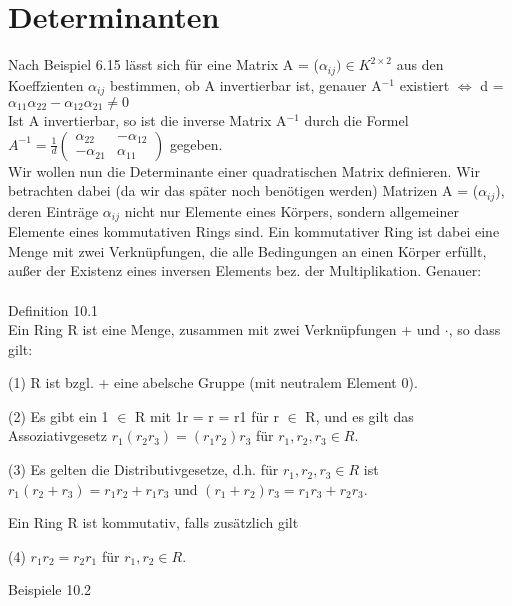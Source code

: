 \section{Determinanten}
Nach Beispiel 6.15 lässt sich für eine Matrix A = ($\alpha_{ij}) \in K^{2 \times 2}$ aus den Koeffzienten $\alpha_{ij}$ bestimmen, ob A invertierbar ist, genauer A$^{-1}$ existiert $\Leftrightarrow$ d = $\alpha_{11}\alpha_{22} - \alpha_{12}\alpha_{21} \neq 0$\\
Ist A invertierbar, so ist die inverse Matrix A$^{-1}$ durch die Formel $A^{-1} = \frac{1}{d} \begin{pmatrix} \alpha_{22} & -\alpha_{12} \\ -\alpha_{21} & \alpha_{11} \end{pmatrix}$ gegeben.\\
Wir wollen nun die Determinante einer quadratischen Matrix definieren. Wir betrachten dabei (da wir das später noch benötigen werden) Matrizen A = ($\alpha_{ij}$), deren Einträge $\alpha_{ij}$ nicht nur Elemente eines Körpers, sondern allgemeiner Elemente eines kommutativen Rings sind. Ein kommutativer Ring ist dabei eine Menge mit zwei Verknüpfungen, die alle Bedingungen an einen Körper erfüllt, außer der Existenz eines inversen Elements bez. der Multiplikation. Genauer:\\
\\
Definition 10.1\\
Ein Ring R ist eine Menge, zusammen mit zwei Verknüpfungen + und $\cdot$, so dass gilt:
\begin{compactenum}
\item[(1)] R ist bzgl. + eine abelsche Gruppe (mit neutralem Element 0).
\item[(2)] Es gibt ein 1 $\in$ R mit 1r = r = r1 für r $\in$ R, und es gilt das Assoziativgesetz $r_1(r_2r_3) = (r_1r_2)r_3$ für $r_1, r_2, r_3 \in R$.
\item[(3)] Es gelten die Distributivgesetze, d.h. für $r_1, r_2, r_3 \in R$ ist $r_1(r_2 + r_3) = r_1r_2 + r_1r_3$ und $(r_1 + r_2)r_3 = r_1r_3 + r_2r_3$.
\end{compactenum}
Ein Ring R ist kommutativ, falls zusätzlich gilt
\begin{compactenum}
\item[(4)] $r_1r_2 = r_2r_1$ für $r_1,r_2 \in R$.\\
\end{compactenum}
Beispiele 10.2
